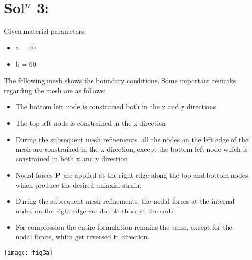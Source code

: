 \section*{Sol$^n$ 3:}
Given material parameters: 
\begin{itemize}
\item a = 40
\item b = 60
\end{itemize}
The following mesh shows the boundary conditions. Some important remarks regarding the mesh are as follows:
\begin{itemize}
\item The bottom left node is constrained both in the x and y directions
\item The top left node is constrained in the x direction
\item During the subsequent mesh refinements, all the nodes on the left edge of the mesh are constrained in the x direction, except the bottom left node which is constrained in both x and y direction
\item Nodal forces $\bf P$ are applied at the right edge along the top and bottom nodes which produce the desired uniaxial strain. 
\item During the subsequent mesh refinements, the nodal forces at the internal nodes on the right edge are double those at the ends. 
\item For compression the entire formulation remains the same, except for the nodal forces, which get reversed in direction. 
\end{itemize}
\begin{center}
\texttt{[image: fig3a]}
\end{center}
